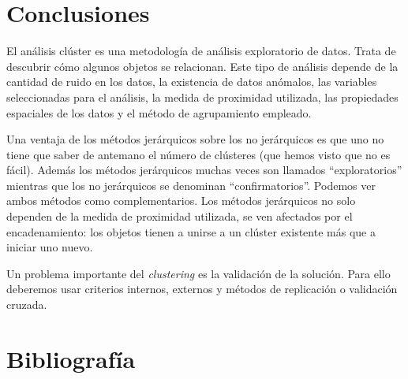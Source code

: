 \documentclass[a4paper, 20pt]{article}
\begin{document}
\clearpage

\section{Conclusiones}
El análisis clúster es una metodología de análisis exploratorio de datos. Trata de descubrir cómo algunos objetos se relacionan. Este tipo de análisis depende de la cantidad de ruido en los datos, la existencia de datos anómalos, las variables seleccionadas para el análisis, la medida de proximidad utilizada, las propiedades espaciales de los datos y el método de agrupamiento empleado.

Una ventaja de los métodos jerárquicos sobre los no jerárquicos es que uno no tiene que saber de antemano el número de clústeres (que hemos visto que no es fácil). Además los métodos jerárquicos muchas veces son llamados ``exploratorios'' mientras que los no jerárquicos se denominan ``confirmatorios''. Podemos ver ambos métodos como complementarios. Los métodos jerárquicos no solo dependen de la medida de proximidad utilizada, se ven afectados por el encadenamiento: los objetos tienen a unirse a un clúster existente más que a iniciar uno nuevo.

Un problema importante del \textit{clustering} es la validación de la solución. Para ello deberemos usar criterios internos, externos y métodos de replicación o validación cruzada.

\clearpage
\section{Bibliografía}
\nocite{*}


\end{document}
